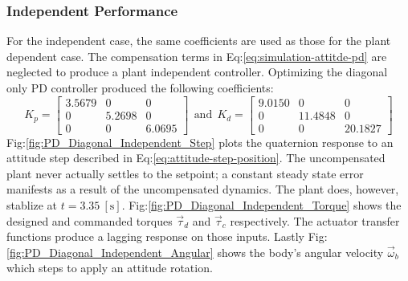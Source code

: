 \subsubsection{Independent Performance}
\label{subsubsec:simulation.atttiude.pd.independent}
For the independent case, the same coefficients are used as those for the plant dependent case. The compensation terms in Eq:\ref{eq:simulation-attitde-pd} are neglected to produce a plant independent controller. Optimizing the diagonal only PD controller produced the following coefficients:
\begin{equation}\label{eq:optimized-pd-independent}
K_p = \begin{bmatrix}
3.5679 & 0 & 0\\
0 & 5.2698 & 0\\
0 & 0 & 6.0695
\end{bmatrix}
~~\text{and}~~K_d = \begin{bmatrix}
9.0150 & 0 & 0\\
0 & 11.4848 & 0\\
0 & 0 & 20.1827
\end{bmatrix}
\end{equation}
Fig:\ref{fig:PD_Diagonal_Independent_Step} plots the quaternion response to an attitude step described in Eq:\ref{eq:attitude-step-position}. The uncompensated plant never actually settles to the setpoint; a constant steady state error manifests as a result of the uncompensated dynamics. The plant does, however, stablize at $t = 3.35~[\text{s}]$. Fig:\ref{fig:PD_Diagonal_Independent_Torque} shows the designed and commanded torques $\vec{\tau}_d$ and $\vec{\tau}_c$ respectively. The actuator transfer functions produce a lagging response on those inputs. Lastly Fig:\ref{fig:PD_Diagonal_Independent_Angular} shows the body's angular velocity $\vec{\omega}_b$ which steps to apply an attitude rotation. 
